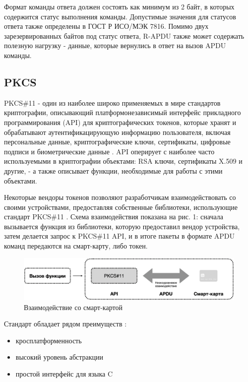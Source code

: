 Формат команды ответа должен состоять как минимум из 2 байт, в которых содержится статус выполнения команды. Допустимые значения для статусов
ответа также определены в ГОСТ Р ИСО/МЭК 7816. Помимо двух зарезервированных байтов под статус ответа, R-APDU также может содержать полезную
нагрузку - данные, которые вернулись в ответ на вызов APDU команды.

\subsection{PKCS}
PKCS\#11 - один из наиболее широко применяемых в мире стандартов криптографии, описывающий платформонезависимый
интерфейс прикладного программирования (API) для криптографических токенов, которые хранят и обрабатывают аутентификацирующую
информацию пользователя, включая персональные данные, криптографические ключи, сертификаты, цифровые подписи и биометрические данные \cite{pkcs}.
API оперирует с наиболее часто используемыми в криптографии объектами: RSA ключи, сертификаты X.509 и другие, - а также описывает функции,
необходимые для работы с этими объектами.

Некоторые вендоры токенов позволяют разработчикам взаимодействовать со своими устройствами, предоставляя собственные библиотеки, использующие
стандарт PKCS\#11 \cite{esmart-pkcs,rutoken-pkcs,alladin-pkcs}. Схема взаимодействия показана на рис. 1: сначала 
вызывается функция из библиотеки, которую предоставил вендор устройства, затем делается запрос к PKCS\#11 API,
и в итоге пакеты в формате APDU команд передаются на смарт-карту, либо токен.

\begin{figure}[H]
  \includegraphics[scale=0.5]{images/apdu-pkcs.png}
  \caption{Взаимодействие со смарт-картой}
  \label{apdu}
\end{figure}

Стандарт обладает рядом преимуществ \cite{pkcs-cons-pros}:
\begin{itemize}
  \item кросплатформенность
  \item высокий уровень абстракции
  \item простой интерфейс для языка C
\end{itemize}

